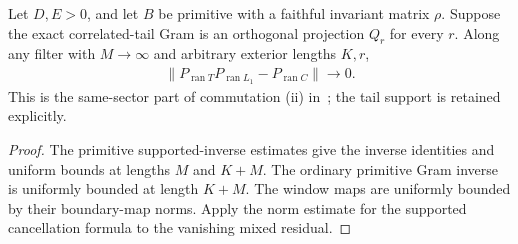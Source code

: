 \begin{lemma}
    \label{thm:residual_window_primitive_projection_decay}
    \leanok
    Let $D,E>0$, and let $B$ be primitive with a faithful invariant matrix
    $\rho$. Suppose the exact correlated-tail Gram is an orthogonal projection
    $Q_r$ for every $r$. Along any filter with $M\to\infty$ and arbitrary
    exterior lengths $K,r$,
    \begin{align}
        \|P_{\operatorname{ran}T}P_{\operatorname{ran}L_1}
        -P_{\operatorname{ran}C}\|\longrightarrow0.
    \end{align}
    This is the same-sector part of commutation (ii)
    in~\cite{Nachtergaele1996Spectral}; the tail support is retained explicitly.

\end{lemma}
\begin{proof}\leanok
    The primitive supported-inverse estimates give the inverse identities
    and uniform bounds at lengths $M$ and $K+M$. The ordinary primitive Gram
    inverse is uniformly bounded at length $K+M$. The window maps are uniformly
    bounded by their boundary-map norms. Apply the norm estimate for the
    supported cancellation formula to the vanishing mixed residual.
\end{proof}

